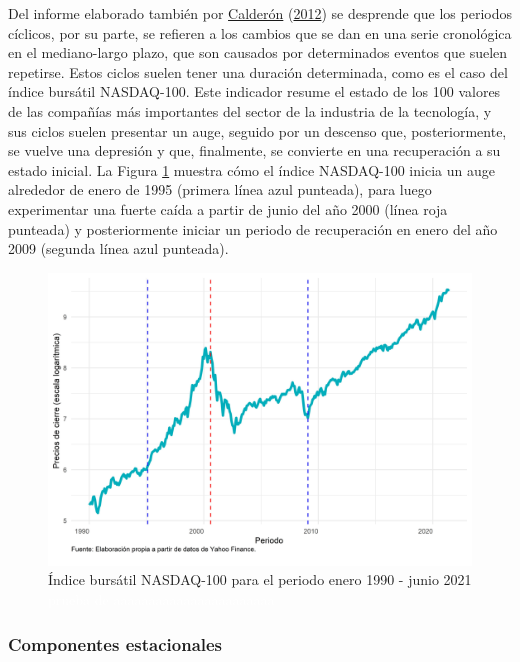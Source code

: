 \documentclass[
]{article}
\begin{document}
Del informe elaborado también por
\protect\hyperlink{ref-calderon2012estadistica}{Calderón}
(\protect\hyperlink{ref-calderon2012estadistica}{2012}) se desprende que
los periodos cíclicos, por su parte, se refieren a los cambios que se
dan en una serie cronológica en el mediano-largo plazo, que son causados
por determinados eventos que suelen repetirse. Estos ciclos suelen tener
una duración determinada, como es el caso del índice bursátil
NASDAQ-100. Este indicador resume el estado de los 100 valores de las
compañías más importantes del sector de la industria de la tecnología, y
sus ciclos suelen presentar un auge, seguido por un descenso que,
posteriormente, se vuelve una depresión y que, finalmente, se convierte
en una recuperación a su estado inicial. La Figura
\ref{fig:ejemplo_ciclo} muestra cómo el índice NASDAQ-100 inicia un auge
alrededor de enero de 1995 (primera línea azul punteada), para luego
experimentar una fuerte caída a partir de junio del año 2000 (línea roja
punteada) y posteriormente iniciar un periodo de recuperación en enero
del año 2009 (segunda línea azul punteada).

\begin{figure}[H]
\includegraphics[width=1\linewidth,height=1\textheight]{Tesis_files/figure-latex/ejemplo_ciclo-1} \caption{Índice bursátil NASDAQ-100 para el periodo enero 1990 - junio 2021 \textcolor{white}{prueba de aaaaaaaaaaaaaaaaaaaaaaa}}\label{fig:ejemplo_ciclo}
\end{figure}

\subsubsection{Componentes estacionales}
\end{document}
